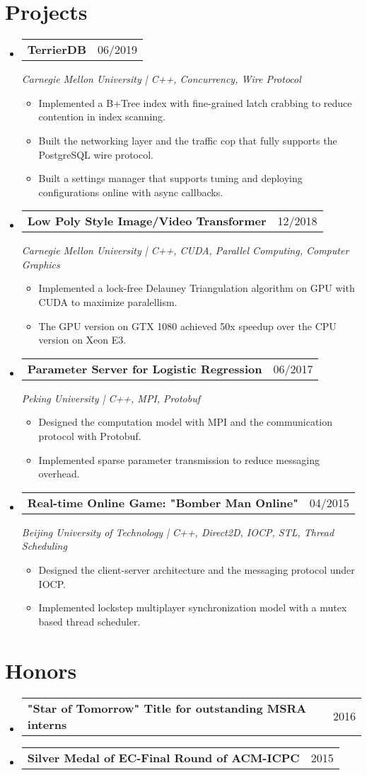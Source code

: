 \documentclass[a4paper,11pt]{article}
\makeatletter
\newcommand{\resumeItem}[1]{
  \item\small{#1 \vspace{-2pt}}
}
\newcommand{\resumeSubheading}[3]{
  \vspace{-1pt}\item
    \begin{tabular*}{0.97\textwidth}{l@{\extracolsep{\fill}}r}
      \textbf{#1} & #2
      \end{tabular*}
      \textit{\small#3}
}
\newcommand{\resumeMiniheading}[2]{
  \vspace{-1pt}\item
    \begin{tabular*}{0.97\textwidth}{l@{\extracolsep{\fill}}r}
      \textbf{#1} & #2
    \end{tabular*}
}
\newcommand{\resumeItemListStart}{\begin{itemize}[leftmargin=*, topsep=0ex]}
\newcommand{\resumeItemListEnd}{\end{itemize}}
\makeatother
\begin{document}
\section{Projects}
  \begin{itemize}[leftmargin=*, itemsep=5pt, label={}]
    \resumeSubheading{TerrierDB}{06/2019}
    {Carnegie Mellon University | C++, Concurrency, Wire Protocol}
    \resumeItemListStart
        \resumeItem {Implemented a B+Tree index with fine-grained latch crabbing to reduce contention in index scanning.}
        \resumeItem {Built the networking layer and the traffic cop that fully supports the PostgreSQL wire protocol.}
        \resumeItem {Built a settings manager that supports tuning and deploying configurations online with async callbacks.}
    \resumeItemListEnd
    
    \resumeSubheading {Low Poly Style Image/Video Transformer} {12/2018}
    {Carnegie Mellon University | C++, CUDA, Parallel Computing, Computer Graphics}
    \resumeItemListStart
        \resumeItem {Implemented a lock-free Delauney Triangulation algorithm on GPU with CUDA to maximize paralellism.}
        \resumeItem {The GPU version on GTX 1080 achieved 50x speedup over the CPU version on Xeon E3.}
    \resumeItemListEnd
    
    \resumeSubheading{Parameter Server for Logistic Regression}{06/2017}
    {Peking University | C++, MPI, Protobuf}
        \resumeItemListStart
            \resumeItem {Designed the computation model with MPI and the communication protocol with Protobuf.}
            \resumeItem {Implemented sparse parameter transmission to reduce messaging overhead.}
        \resumeItemListEnd
        
    \resumeSubheading{Real-time Online Game: "Bomber Man Online"}{04/2015}{Beijing University of Technology | C++, Direct2D, IOCP, STL, Thread Scheduling}
        \resumeItemListStart
            \resumeItem {Designed the client-server architecture and the messaging protocol under IOCP.}
            \resumeItem {Implemented lockstep multiplayer synchronization model with a mutex based thread scheduler.}
        \resumeItemListEnd
        
  \end{itemize}

\section{Honors}
  \begin{itemize}[leftmargin=*, itemsep=-1pt, label={}]
    \resumeMiniheading{"Star of Tomorrow" Title for outstanding MSRA interns \normalfont{(Rate: 10\%)}}{2016}
    \resumeMiniheading{Silver Medal of EC-Final Round of ACM-ICPC}{2015}
  \end{itemize}
\end{document}
